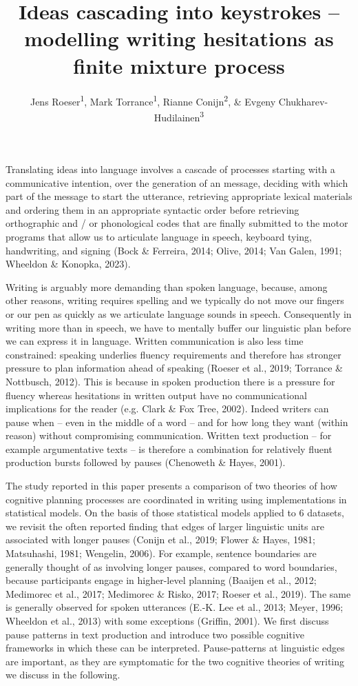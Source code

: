 \documentclass[
  english,
  man,floatsintext]{apa7}
\title{Ideas cascading into keystrokes -- modelling writing hesitations as finite mixture process}
\author{Jens Roeser\textsuperscript{1}, Mark Torrance\textsuperscript{1}, Rianne Conijn\textsuperscript{2}, \& Evgeny Chukharev-Hudilainen\textsuperscript{3}}
\date{}
\affiliation{\vspace{0.5cm}\textsuperscript{1} Department of Psychology, Nottingham Trent University, United Kingdom\\\textsuperscript{2} Artificial Intelligence Systems Institute, Eindhoven University of Technology, The Netherlands\\\textsuperscript{3} Department of English, Iowa State University, Iowa}
\begin{document}
\maketitle

Translating ideas into language involves a cascade of processes starting with a communicative intention, over the generation of an message, deciding with which part of the message to start the utterance, retrieving appropriate lexical materials and ordering them in an appropriate syntactic order before retrieving orthographic and / or phonological codes that are finally submitted to the motor programs that allow us to articulate language in speech, keyboard tying, handwriting, and signing (Bock \& Ferreira, 2014; Olive, 2014; Van Galen, 1991; Wheeldon \& Konopka, 2023).

Writing is arguably more demanding than spoken language, because, among other reasons, writing requires spelling and we typically do not move our fingers or our pen as quickly as we articulate language sounds in speech. Consequently in writing more than in speech, we have to mentally buffer our linguistic plan before we can express it in language. Written communication is also less time constrained: speaking underlies fluency requirements and therefore has stronger pressure to plan information ahead of speaking (Roeser et al., 2019; Torrance \& Nottbusch, 2012). This is because in spoken production there is a pressure for fluency whereas hesitations in written output have no communicational implications for the reader (e.g. Clark \& Fox Tree, 2002). Indeed writers can pause when -- even in the middle of a word -- and for how long they want (within reason) without compromising communication. Written text production -- for example argumentative texts -- is therefore a combination for relatively fluent production bursts followed by pauses (Chenoweth \& Hayes, 2001).

The study reported in this paper presents a comparison of two theories of how cognitive planning processes are coordinated in writing using implementations in statistical models. On the basis of those statistical models applied to 6 datasets, we revisit the often reported finding that edges of larger linguistic units are associated with longer pauses (Conijn et al., 2019; Flower \& Hayes, 1981; Matsuhashi, 1981; Wengelin, 2006). For example, sentence boundaries are generally thought of as involving longer pauses, compared to word boundaries, because participants engage in higher-level planning (Baaijen et al., 2012; Medimorec et al., 2017; Medimorec \& Risko, 2017; Roeser et al., 2019). The same is generally observed for spoken utterances (E.-K. Lee et al., 2013; Meyer, 1996; Wheeldon et al., 2013) with some exceptions (Griffin, 2001). We first discuss pause patterns in text production and introduce two possible cognitive frameworks in which these can be interpreted. Pause-patterns at linguistic edges are important, as they are symptomatic for the two cognitive theories of writing we discuss in the following.
\end{document}
